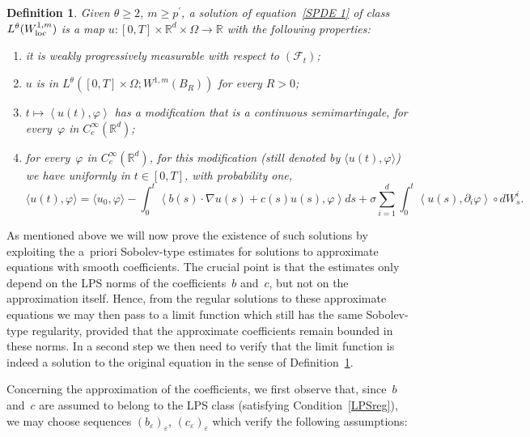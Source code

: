 \documentclass[a4paper,10pt]{article}
\newtheorem{definition}[theorem]{Definition}
\newcommand\1{\mathbbm{1}}
\newcommand{\eps}{\varepsilon}
\newcommand\loc{{\rm loc}}
\numberwithin{equation}{section}
\begin{document}
\begin{definition}
\label{Defin regular solutions}Given $\theta\geq2$, $m\geq p^{\prime}$, \emph{a solution of equation~\eqref{SPDE 1} of class $L^{\theta}(  W_{\loc}^{1,m})$} is a map $u:[0,T]\times\mathbb{R}^{d}\times\Omega \rightarrow \mathbb{R}$ with the following properties:
\begin{enumerate}[font=\normalfont, label=(\roman{*}), ref=(\roman{*})]
 \item[(o)] it is weakly progressively measurable with respect to $(\mathcal{F}_{t})  $;
 \item $u$ is in $L^{\theta}([0,T]\times\Omega ;W^{1,m}(B_{R}))$ for every $R>0$; \label{strat0}
 \item \label{strat1} $t\mapsto\left\langle u(t)  ,\varphi\right\rangle $ has a modification that is a continuous semimartingale, for every~$\varphi$ in $C_{c}^{\infty}(\mathbb{R}^{d})$; 
 \item for every~$\varphi$ in $C_{c}^{\infty}(\mathbb{R}^{d})$, for this modification \textup{(}still denoted by $\langle u(t),\varphi\rangle$\textup{)} we have uniformly in $t\in[  0,T]  $, with probability one, \label{strat2}
 \begin{equation}
 \langle u(t),\varphi\rangle=\langle u_{0},\varphi\rangle -\int_{0}^{t}\left\langle b(s) \cdot\nabla u(s) +c(s) u(s),\varphi\right\rangle ds+\sigma \sum_{i=1}^{d}\int_{0}^{t}\left\langle u(s),\partial_{i} \varphi\right\rangle \circ dW_{s}^{i}.\label{SPDEdiff} 
 \end{equation}
\end{enumerate}
\end{definition}

As mentioned above we will now prove the existence of such solutions by exploiting the a~priori Sobolev-type estimates for solutions to approximate equations with smooth coefficients. The crucial point is that the estimates only depend on the LPS norms of the coefficients~$b$ and~$c$, but not on the approximation itself. Hence, from the regular solutions to these approximate equations we may then pass to a limit function which still has the same Sobolev-type regularity, provided that the approximate coefficients remain bounded in these norms. In a second step we then need to verify that the limit function is indeed a solution to the original equation in the sense of Definition~\ref{Defin regular solutions}. 

Concerning the approximation of the coefficients, we first observe that, since~$b$ and~$c$ are assumed to belong to the LPS class (satisfying Condition~\ref{LPSreg}), we may choose sequences $(b_\eps)_\eps$, $(c_\eps)_\eps$ which verify the following assumptions:
\end{document}
